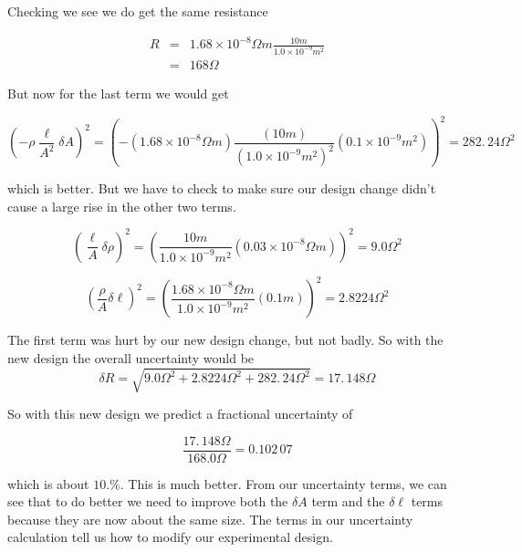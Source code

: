 Checking we see we do get the same resistance 

\begin{eqnarray*}
	R &=&1.68\times 10^{-8}\unit{\Omega	}\unit{m}\frac{10\unit{m}}{1.0\times 10^{-9}\unit{m}^{2}} \\
	&=&168\unit{\Omega}
\end{eqnarray*}

But now for the last term we would get 

\begin{equation*}
	\left( -\rho \frac{\ell }{A^{2}}\delta A\right) ^{2}=\left( -\left(
	1.68\times 10^{-8}\unit{\Omega}\unit{m}\right) \frac{\left( 10\unit{m}\right) }{\left( 1.0\times 10^{-9}\unit{m}^{2}\right) ^{2}}\left( 0.1\times 10^{-9}\unit{m}^{2}\right) \right)^{2}=282.\,\allowbreak 24\unit{\Omega}^{2}
\end{equation*}

which is better. But we have to check to make sure our design change didn't
cause a large rise in the other two terms. 

\begin{equation*}
	\left( \frac{\ell }{A}\delta \rho \right) ^{2}=\left( \frac{10\unit{m}}{		1.0\times 10^{-9}\unit{m}^{2}}\left( 0.03\times 10^{-8}\unit{\Omega}\unit{m}\right) \right) ^{2}=9.0\unit{\Omega}^{2}
\end{equation*}

\begin{equation*}
	\left( \frac{\rho }{A}\delta \ell \right) ^{2}=\left( \frac{1.68\times
		10^{-8}\unit{\Omega}\unit{m}}{1.0\times 10^{-9}\unit{m}^{2}}\left( 0.1\unit{m}\right) \right)^{2}=2.8224\unit{\Omega}^{2}
\end{equation*}

The first term was hurt by our new design change, but not badly. So with the
new design the overall uncertainty would be 
\begin{equation*}
	\delta R=\sqrt{9.0\unit{\Omega}^{2}+2.8224\unit{\Omega}^{2}+282.\,\allowbreak 24\unit{\Omega		}^{2}}=17.\,\allowbreak 148\unit{\Omega}
\end{equation*}

$\allowbreak $So with this new design we predict a fractional uncertainty of

\begin{equation*}
	\frac{17.\,\allowbreak 148\unit{\Omega}}{168.0\unit{\Omega	}}=0.102\,07
\end{equation*}

which is about $\allowbreak 10.\%.$ This is much better. From our uncertainty terms, we can see that to do better we need to improve both the $\delta A$ term and the $\delta \ell $ terms because they are now about the same size. The terms in our uncertainty calculation tell us how to modify our experimental design.

